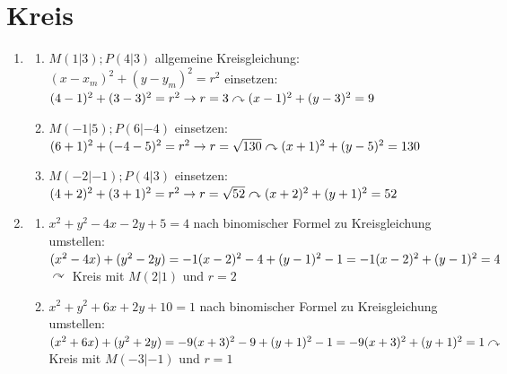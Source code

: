\section{Kreis}
\begin{enumerate}
\item \begin{enumerate}
		\item $M(1|3); P(4|3)$ \newline
		allgemeine Kreisgleichung: $(x-x_m)^2 + (y-y_m)^2 =r^2$ \newline
		einsetzen: $(4-1)^2 + (3-3)^2 =r^2\\
		\rightarrow r=3\\
		\curvearrowright (x-1)^2+(y-3)^2 = 9$
		
		\item $M(-1|5); P(6|-4)$ \newline
		einsetzen: $(6+1)^2 + (-4-5)^2 =r^2\\
		\rightarrow r=\sqrt{130}\\
		\curvearrowright (x+1)^2+(y-5)^2 = 130$
		
		\item $M(-2|-1); P(4|3)$ \newline
		einsetzen: $(4+2)^2 + (3+1)^2 =r^2\\
		\rightarrow r=\sqrt{52}\\
		\curvearrowright (x+2)^2+(y+1)^2 = 52$
		
		\end{enumerate}
		
	\item \begin{enumerate}
			\item $x^2 + y^2 - 4x - 2y + 5 = 4$ \newline
			nach binomischer Formel zu Kreisgleichung umstellen:\newline
			$ (x^2-4x)+ (y^2-2y) = -1 \\
			(x-2)^2 -4 + (y-1)^2 -1 = -1 \\
			(x-2)^2 + (y-1)^2 = 4$\newline \newline
			$\curvearrowright$ Kreis mit $M(2|1)$ und $r= 2$
			
			\item $ x^2 + y^2 +6x +2y+10 =1$ \newline
			nach binomischer Formel zu Kreisgleichung umstellen:\newline
			$ (x^2+ 6x) + (y^2 + 2y) = -9 \\
			(x+3)^2 -9 +(y+1)^2 -1 = -9\\
			(x+3)^2 +(y+1)^2 = 1\\ \\
			\curvearrowright$ Kreis mit $M(-3|-1)$ und $r=1$ 
			\end{enumerate}
			

\end{enumerate}
